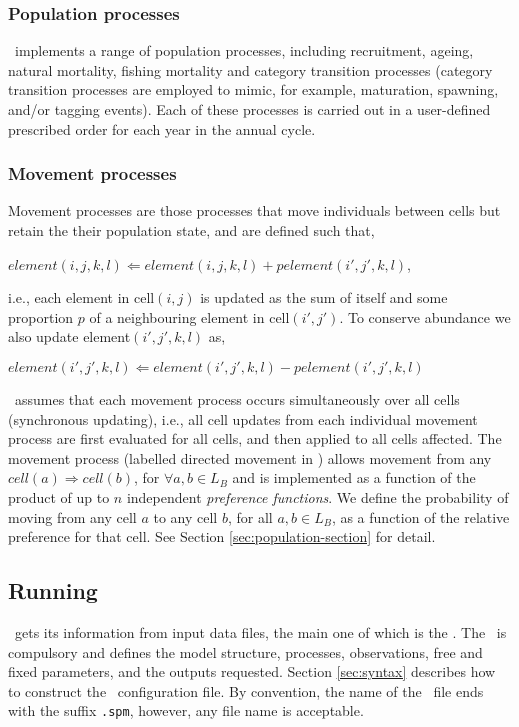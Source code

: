 \subsubsection{Population processes}

\SPM\ implements a range of population processes, including recruitment, ageing, natural mortality, fishing mortality and category transition processes (category transition processes are employed to mimic, for example, maturation, spawning, and/or tagging events). Each of these processes is carried out in a user-defined prescribed order for each year in the annual cycle.  

\subsubsection{Movement processes}

Movement processes are those processes that move individuals between cells but retain the their population state, and are defined such that,

$element(i,j,k,l)\Leftarrow element(i,j,k,l) + p element(i',j',k,l)$,

i.e., each element in cell$(i,j)$ is updated as the sum of itself and some proportion $p$ of a neighbouring element in cell$(i',j')$. To conserve abundance we also update element$(i',j',k,l)$ as,

$element(i',j',k,l)\Leftarrow element(i',j',k,l) - p element(i',j',k,l)$

\SPM\ assumes that each movement process occurs simultaneously over all cells (synchronous updating), i.e., all cell updates from each individual movement process are first evaluated for all cells, and then applied to all cells affected. The movement process (labelled directed movement in \SPM) allows movement from any $cell(a) \Rightarrow cell(b)$, for $\forall a,b \in L_B$ and is implemented as a function of the product of up to $n$ independent \emph{preference functions}. We define the probability of moving from any cell $a$ to any cell $b$, for all $a,b \in L_B$, as a function of the relative preference for that cell. See Section \ref{sec:population-section} for detail.

\subsection{Running \SPM}

\SPM\ gets its information from input data files, the main one of which is the \config. The \config\ is compulsory and defines the model structure, processes, observations, free and fixed parameters, and the outputs requested. Section \ref{sec:syntax} describes how to construct the \SPM\ configuration file. By convention, the name of the \config\ file ends with the suffix \texttt{.spm}, however, any file name is acceptable.

